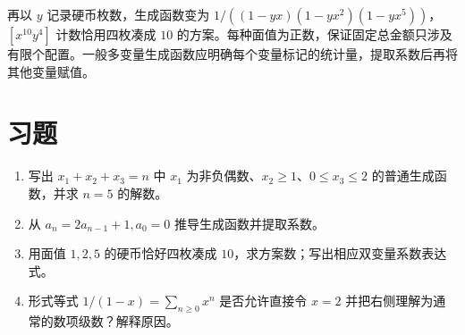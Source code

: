 再以 $y$ 记录硬币枚数，生成函数变为 $1/((1-yx)(1-yx^2)(1-yx^5))$，$[x^{10}y^4]$ 计数恰用四枚凑成 $10$ 的方案。每种面值为正数，保证固定总金额只涉及有限个配置。一般多变量生成函数应明确每个变量标记的统计量，提取系数后再将其他变量赋值。

\section{习题}
\begin{enumerate}
  \item\label{ex:ogf-1} 写出 $x_1+x_2+x_3=n$ 中 $x_1$ 为非负偶数、$x_2\ge1$、$0\le x_3\le2$ 的普通生成函数，并求 $n=5$ 的解数。
  \item\label{ex:ogf-2} 从 $a_n=2a_{n-1}+1,a_0=0$ 推导生成函数并提取系数。
  \item\label{ex:ogf-3} 用面值 $1,2,5$ 的硬币恰好四枚凑成 $10$，求方案数；写出相应双变量系数表达式。
  \item\label{ex:ogf-4} 形式等式 $1/(1-x)=\sum_{n\ge0}x^n$ 是否允许直接令 $x=2$ 并把右侧理解为通常的数项级数？解释原因。
\end{enumerate}

